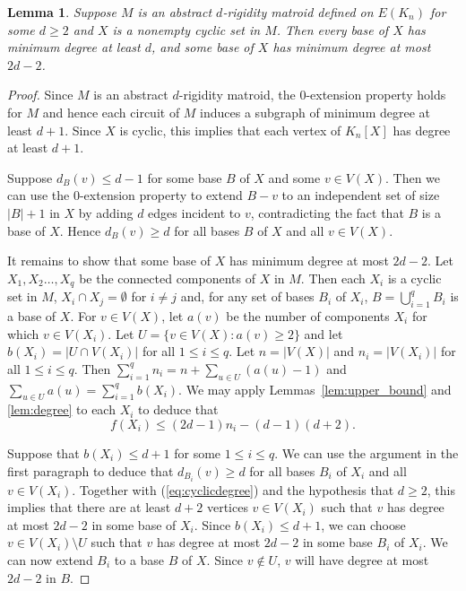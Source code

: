 \documentclass{daj}
\newtheorem{lemma}[thm]{Lemma}\theoremstyle{plain}
\begin{document}
\begin{lemma}\label{lem:cyclicdegree}
Suppose $M$ is an abstract $d$-rigidity matroid defined on $E(K_n)$ for some $d\geq 2$ and $X$ is a nonempty cyclic set in $M$.
Then every base of $X$ has minimum degree at least $d$, and some base of $X$ has minimum degree at most $2d-2$.
\end{lemma}
\begin{proof}
Since $M$ is an  abstract $d$-rigidity matroid, the 0-extension property holds for $M$ and hence each circuit of $M$ induces a subgraph of minimum degree at least $d+1$.  Since $X$ is cyclic, this implies that each vertex of $K_n[X]$ has degree at least $d+1$. 

Suppose $d_B(v)\leq d-1$ for some base $B$ of $X$ and some $v\in V(X)$. Then we can use the 0-extension property to extend $B-v$ to an independent set of size $|B|+1$ in $X$ by adding $d$ edges incident to $v$, contradicting the fact that $B$ is a base of $X$. Hence  $d_B(v)\geq d$ for all bases $B$ of $X$ and all $v\in V(X)$.



It remains to show that some base of $X$ has minimum degree at most $2d-2$.
Let $X_1,X_2\ldots,X_q$ be the connected components of $X$ in $M$. Then each $X_i$ is a cyclic set in $M$, $X_i\cap X_j=\emptyset$ for $i\neq j$ and, for any set of bases $B_i$ of $X_i$, $B=\bigcup_{i=1}^q B_i$ is a base of $X$. For $v\in V(X)$, let $a(v)$ be the number of components $X_i$ for which $v\in V(X_i)$. Let $U=\{v\in V(X):a(v)\geq 2\}$ and let $b(X_i)=|U\cap V(X_i)|$ for all $1\leq i\leq q$. Let $n=|V(X)|$ and $n_i=|V(X_i)|$ for all $1\leq i\leq q$. Then 
$\sum_{i=1}^q n_i=n+\sum_{u\in U}(a(u)-1)$ and $\sum_{u\in U}a(u)=\sum_{i=1}^q b(X_i)$. We may apply Lemmas~\ref{lem:upper_bound} and \ref{lem:degree} to each $X_i$ to deduce that
\begin{equation}\label{eq:cyclicdegree}
f(X_i)\leq (2d-1)n_i-(d-1)(d+2).
\end{equation}

Suppose that $b(X_i)\leq d+1$ for some $1\leq i\leq q$. We can use the argument in the first paragraph to deduce that $d_{B_i}(v)\geq d$ for all bases $B_i$ of $X_i$ and all $v\in V(X_i)$.  Together with (\ref{eq:cyclicdegree}) and the hypothesis that $d\geq 2$, this implies that  there are at least $d+2$ vertices $v\in V(X_i)$ such that $v$ has degree at most $2d-2$ in some base of $X_i$. Since $b(X_i)\leq d+1$, we can choose $v\in V(X_i)\setminus U$ such that $v$ has degree at most $2d-2$ in some base $B_i$ of $X_i$. We can now extend $B_i$ to a base $B$ of $X$. Since $v\not\in U$, $v$ will have degree at most $2d-2$ in $B$. 


\end{proof}
\end{document}
